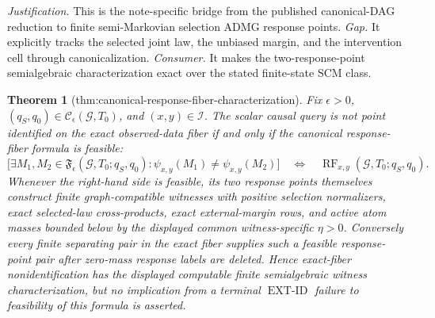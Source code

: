 \documentclass{article}
\newtheorem{theorem}{Theorem}
\begin{document}
\par\smallskip\noindent \textit{Justification.} This is the note-specific bridge from the published canonical-DAG reduction to finite semi-Markovian selection ADMG response points. \textit{Gap.} It explicitly tracks the selected joint law, the unbiased margin, and the intervention cell through canonicalization. \textit{Consumer.} It makes the two-response-point semialgebraic characterization exact over the stated finite-state SCM class.

\begin{theorem}[thm:canonical-response-fiber-characterization]\label{thm:canonical-response-fiber-characterization}
Fix \(\epsilon>0\), \((q_S,q_0)\in\mathcal C_{\epsilon}(\mathcal G,T_0)\), and \((x,y)\in\mathcal I\).  The scalar causal query is not point identified on the exact observed-data fiber if and only if the canonical response-fiber formula is feasible:
\[
 \bigl[\exists M_1,M_2\in\mathfrak F_{\epsilon}(\mathcal G,T_0;q_S,q_0):
 \psi_{x,y}(M_1)\neq\psi_{x,y}(M_2)\bigr]
 \quad\Longleftrightarrow\quad
 \operatorname{RF}_{x,y}(\mathcal G,T_0;q_S,q_0).
\]
Whenever the right-hand side is feasible, its two response points themselves construct finite graph-compatible witnesses with positive selection normalizers, exact selected-law cross-products, exact external-margin rows, and active atom masses bounded below by the displayed common witness-specific \(\eta>0\).  Conversely every finite separating pair in the exact fiber supplies such a feasible response-point pair after zero-mass response labels are deleted.  Hence exact-fiber nonidentification has the displayed computable finite semialgebraic witness characterization, but no implication from a terminal \(\operatorname{EXT\text{-}ID}\) failure to feasibility of this formula is asserted.
\end{theorem}
\end{document}
